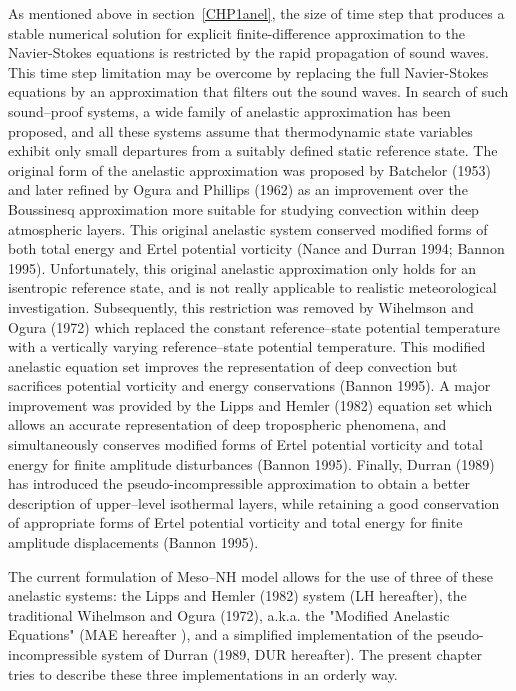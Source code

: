 As mentioned above in section~\ref{CHP1anel},
the size of time step that produces a stable numerical solution for explicit
finite-difference approximation to the Navier-Stokes equations is restricted by the rapid
propagation of sound waves. This time step limitation may be overcome by replacing the full
Navier-Stokes equations by an approximation that filters out the sound waves.
In search of such sound--proof systems, a wide family of anelastic approximation has been
proposed, and all these systems assume that thermodynamic state variables exhibit only
small departures from a suitably defined static reference state. The original form of the
anelastic approximation was proposed by Batchelor (1953)
and later refined by Ogura and Phillips (1962) as an improvement over the Boussinesq
approximation more suitable for studying convection within deep atmospheric layers. This
original anelastic system conserved modified forms of both total energy and Ertel potential
vorticity (Nance and Durran 1994; Bannon 1995). Unfortunately, this original anelastic
approximation only holds for an isentropic reference state, and is not really applicable to
realistic meteorological
investigation. Subsequently, this restriction was removed by Wihelmson and Ogura (1972) which
replaced the constant reference--state potential temperature with a vertically varying
reference--state potential temperature. This modified anelastic equation  set improves the
representation of deep convection but sacrifices potential vorticity and energy conservations
(Bannon 1995). A major improvement was provided by the Lipps and Hemler (1982) equation set
which allows an accurate representation of deep tropospheric phenomena, and
simultaneously conserves modified forms of Ertel potential vorticity and total energy for finite
amplitude disturbances (Bannon 1995). Finally, Durran (1989) has introduced the
pseudo-incompressible approximation  to obtain a better description of
upper--level isothermal layers, while retaining a good conservation of appropriate forms of
Ertel potential vorticity and total energy for finite amplitude displacements (Bannon 1995).

The current formulation of Meso--NH model allows for the use of three of these anelastic
systems: the Lipps and Hemler (1982) system (LH hereafter), the traditional Wihelmson and
Ogura (1972), a.k.a. the "Modified Anelastic Equations" (MAE hereafter ), and a simplified
implementation of the pseudo-incompressible system of Durran (1989, DUR hereafter). The
present chapter tries to describe these three implementations in an orderly way.

